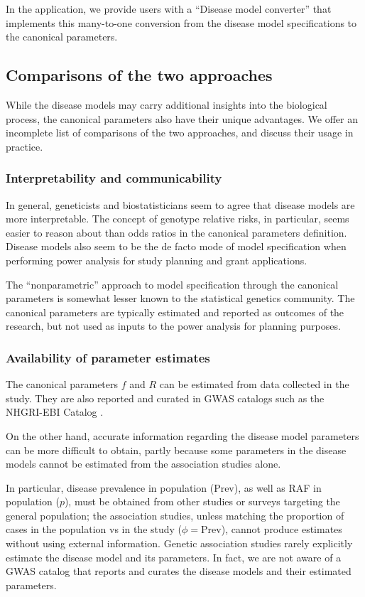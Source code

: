In the application, we provide users with a ``Disease model converter'' that implements this many-to-one conversion from the disease model specifications to the canonical parameters.


\subsection{Comparisons of the two approaches}
\label{subsec:comparing-two-approaches}

While the disease models may carry additional insights into the biological process, the canonical parameters also have their unique advantages.
We offer an incomplete list of comparisons of the two approaches, and discuss their usage in practice.

\subsubsection{Interpretability and communicability}

In general, geneticists and biostatisticians seem to agree that disease models are more interpretable.
The concept of genotype relative risks, in particular, seems easier to reason about than odds ratios in the canonical parameters definition.
Disease models also seem to be the de facto mode of model specification when performing power analysis for study planning and grant applications.

The ``nonparametric'' approach to model specification through the canonical parameters is somewhat lesser known to the statistical genetics community.
The canonical parameters are typically estimated and reported as outcomes of the research, but not used as inputs to the power analysis for planning purposes.

\subsubsection{Availability of parameter estimates}

The canonical parameters $f$ and $R$ can be estimated from data collected in the study.
They are also reported and curated in GWAS catalogs such as the NHGRI-EBI Catalog \citep{MacArthur16}.

On the other hand, accurate information regarding the disease model parameters can be more difficult to obtain, partly because some parameters in the disease models cannot be estimated from the association studies alone.

In particular, disease prevalence in population (Prev), as well as RAF in population ($p$), must be obtained from other studies or surveys targeting the general population; the association studies, unless matching the proportion of cases in the population vs in the study ($\phi=\text{Prev}$), cannot produce estimates without using external information.
Genetic association studies rarely explicitly estimate the disease model and its parameters.
In fact, we are not aware of a GWAS catalog that reports and curates the disease models and their estimated parameters.

